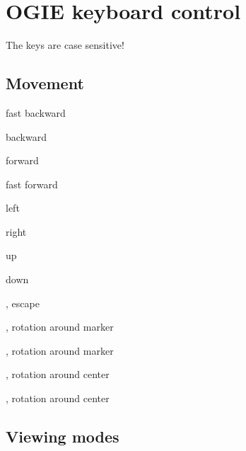 

\newenvironment{hkkeys}
    {\begin{list}{}
        {
        \setlength{\leftmargin}{9em}
        \setlength{\labelwidth}{8em}
        \setlength{\labelsep}{2em}
        \setlength{\parsep}{0em}
        \setlength{\itemsep}{0.5ex}
        }
    }
    {\end{list}}


\section{OGIE keyboard control}
\label{keys}

The keys are case sensitive!

\subsection*{Movement}

\begin{hkkeys}
\item[\keys{a}]        fast backward
\item[\keys{s}]        backward
\item[\keys{g}]        forward
\item[\keys{space}]    fast forward
\item[\keys{d}]        left
\item[\keys{f}]        right
\item[\keys{t}]        up
\item[\keys{z}]        down
\item[\keys{q}, \keys{esc}]    escape
\item[\keys{\arrowkeyleft}, \keys{\arrowkeyright}] rotation around marker
\item[\keys{\arrowkeyup}, \keys{\arrowkeydown}] rotation around marker
\item[\keys{\shift+\arrowkeyleft}, \keys{\shift+\arrowkeyright}]
            rotation around center
\item[\keys{\shift+\arrowkeyup}, \keys{\shift+\arrowkeydown}]
            rotation around center

\end{hkkeys}



\subsection*{Viewing modes}

